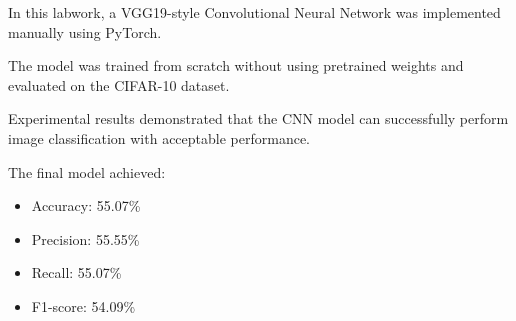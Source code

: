 \documentclass[12pt]{article}
\begin{document}
In this labwork, a VGG19-style Convolutional Neural Network was implemented manually using PyTorch.

The model was trained from scratch without using pretrained weights and evaluated on the CIFAR-10 dataset.

Experimental results demonstrated that the CNN model can successfully perform image classification with acceptable performance.

The final model achieved:

\begin{itemize}
    \item Accuracy: 55.07\%
    \item Precision: 55.55\%
    \item Recall: 55.07\%
    \item F1-score: 54.09\%
\end{itemize}
\end{document}
